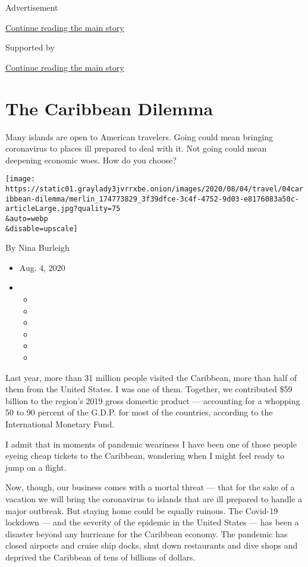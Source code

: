 Advertisement

\protect\hyperlink{after-top}{Continue reading the main story}

Supported by

\protect\hyperlink{after-sponsor}{Continue reading the main story}

\hypertarget{the-caribbean-dilemma}{%
\section{The Caribbean Dilemma}\label{the-caribbean-dilemma}}

Many islands are open to American travelers. Going could mean bringing
coronavirus to places ill prepared to deal with it. Not going could mean
deepening economic woes. How do you choose?

\texttt{[image: https://static01.graylady3jvrrxbe.onion/images/2020/08/04/travel/04caribbean-dilemma/merlin\_174773829\_3f39dfce-3c4f-4752-9d03-e8176083a50c-articleLarge.jpg?quality=75\\\&auto=webp\\\&disable=upscale]}

By Nina Burleigh

\begin{itemize}
\item
  Aug. 4, 2020
\item
  \begin{itemize}
  \item
  \item
  \item
  \item
  \item
  \item
  \end{itemize}
\end{itemize}

Last year, more than 31 million people visited the Caribbean, more than
half of them from the United States. I was one of them. Together, we
contributed \$59 billion to the region's 2019 gross domestic product ---
accounting for a whopping 50 to 90 percent of the G.D.P. for most of the
countries, according to the International Monetary Fund.

I admit that in moments of pandemic weariness I have been one of those
people eyeing cheap tickets to the Caribbean, wondering when I might
feel ready to jump on a flight.

Now, though, our business comes with a mortal threat --- that for the
sake of a vacation we will bring the coronavirus to islands that are ill
prepared to handle a major outbreak. But staying home could be equally
ruinous. The Covid-19 lockdown --- and the severity of the epidemic in
the United States --- has been a disaster beyond any hurricane for the
Caribbean economy. The pandemic has closed airports and cruise ship
docks, shut down restaurants and dive shops and deprived the Caribbean
of tens of billions of dollars.

